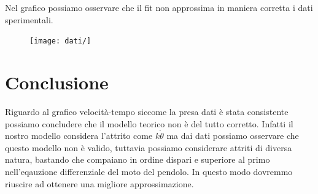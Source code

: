 \documentclass[a4paper,10pt]{article}
\begin{document}
Nel grafico possiamo osservare che il fit non approssima in maniera corretta i dati sperimentali.

\begin{figure}[!htb]
\begin{center}
\texttt{[image: dati/]}
\end{center}
\end{figure}



\section{Conclusione}
Riguardo al grafico velocità-tempo siccome la presa dati è stata consistente possiamo concludere che il modello teorico non è del tutto corretto. Infatti il nostro modello considera
l'attrito come $k\dot{\theta}$ ma dai dati possiamo osservare che questo modello non è valido, tuttavia possiamo considerare attriti di diversa natura, bastando che compaiano in ordine dispari 
e superiore al primo nell'eqauzione differenziale del moto del pendolo. In questo modo dovremmo riuscire ad ottenere una migliore approssimazione.
\end{document}
